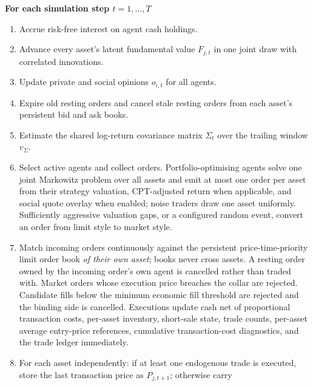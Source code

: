 \documentclass[12pt, a4paper]{article}
\begin{document}
\begin{framed}
                \textbf{For each simulation step \(t=1,\ldots,T\)}
                \begin{enumerate}
                    \item Accrue risk-free interest on agent cash holdings.
                    \item Advance every asset's latent fundamental value \(F_{j,t}\) in one
                    joint draw with correlated innovations.
                    \item Update private and social opinions \(o_{i,t}\) for all agents.
                    \item Expire old resting orders and cancel stale resting orders from each
                    asset's persistent bid and ask books.
                    \item Estimate the shared log-return covariance matrix \(\Sigma_t\) over
                    the trailing window \(v_{\Sigma}\).
                    \item Select active agents and collect orders. Portfolio-optimising agents
                    solve one joint Markowitz problem over all assets and emit at most one
                    order per asset from their strategy valuation, CPT-adjusted return when
                    applicable, and social quote overlay when enabled; noise traders draw one
                    asset uniformly. Sufficiently aggressive valuation gaps, or a
                    configured random event, convert an order from limit style to market style.
                    \item Match incoming orders continuously against the persistent
                    price-time-priority limit order book \emph{of their own asset}; books never
                    cross assets. A resting order owned by the incoming order's own agent is
                    cancelled rather than traded with. Market orders whose execution price
                    breaches the collar are rejected. Candidate fills below the
                    minimum economic fill threshold are rejected and the binding side
                    is cancelled. Executions update cash net of
                    proportional transaction costs, per-asset inventory, short-sale state, trade
                    counts, per-asset average entry-price references, cumulative
                    transaction-cost diagnostics, and the trade ledger immediately.
                    \item For each asset independently: if at least one endogenous trade is
                    executed, store the last transaction price as \(P_{j,t+1}\); otherwise carry

\end{enumerate}
\end{framed}
\end{document}
